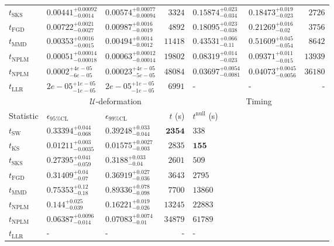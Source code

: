 \begin{tabular}{l|llr|llr}
	$t_{\mathrm{SKS}}$ & $0.00441_{-0.0014}^{+0.00092}$ & $0.00574_{-0.00094}^{+0.00077}$ & $3324$ & $0.15874_{-0.034}^{+0.023}$ & $0.18473_{-0.023}^{+0.019}$ & $2726$ \\
	$t_{\mathrm{FGD}}$ & $0.00722_{-0.0027}^{+0.0021}$ & $0.00987_{-0.0019}^{+0.0016}$ & $4892$ & $0.18095_{-0.038}^{+0.023}$ & $0.21269_{-0.02}^{+0.016}$ & $3756$ \\
	$t_{\mathrm{MMD}}$ & $0.00353_{-0.0015}^{+0.0016}$ & $0.00494_{-0.0012}^{+0.0014}$ & $11418$ & $0.43531_{-0.11}^{+0.066}$ & $0.51609_{-0.054}^{+0.045}$ & $8642$ \\
\rowcolor{red!35}	$t_{\mathrm{NPLM}}$ & $0.00051_{-0.00018}^{+0.00014}$ & $0.00063_{-0.00014}^{+0.00012}$ & $19802$ & $0.08319_{-0.023}^{+0.014}$ & $0.09371_{-0.015}^{+0.011}$ & $13939$ \\
\rowcolor{blue!35}	$t_{\mathrm{NPLM}}$ & $0.0002_{-6e-05}^{+4e-05}$ & $0.00023_{-5e-05}^{+4e-05}$ & $48084$ & $0.03697_{-0.0081}^{+0.0054}$ & $0.04073_{-0.0056}^{+0.0045}$ & $36180$ \\
	$t_{\mathrm{LLR}}$ & $2e-05_{-1e-05}^{+1e-05}$ & $2e-05_{-1e-05}^{+1e-05}$ & $6991$ & - & - & - \\
	\toprule
	\multicolumn{1}{c}{} & \multicolumn{3}{c}{$\mathcal{U}$-deformation} & \multicolumn{3}{c}{Timing} \\
	Statistic & $\epsilon_{95\%\mathrm{CL}}$ & $\epsilon_{99\%\mathrm{CL}}$ & $t$ (s) & $t^{\mathrm{null}}$ (s) \\
	\midrule
	$t_{\mathrm{SW}}$ & $0.33394_{-0.068}^{+0.044}$ & $0.39248_{-0.044}^{+0.033}$ & ${\mathbf{2354}}$ & $338$ \\
	$t_{\overline{\mathrm{KS}}}$ & ${\mathbf{0.01211_{-0.0035}^{+0.003}}}$ & ${\mathbf{0.01575_{-0.003}^{+0.0027}}}$ & $2835$ & ${\mathbf{155}}$ \\
	$t_{\mathrm{SKS}}$ & $0.27395_{-0.059}^{+0.041}$ & $0.3188_{-0.04}^{+0.033}$ & $2601$ & $509$ \\
	$t_{\mathrm{FGD}}$ & $0.31409_{-0.07}^{+0.04}$ & $0.36919_{-0.036}^{+0.027}$ & $3643$ & $2795$ \\
	$t_{\mathrm{MMD}}$ & $0.75353_{-0.18}^{+0.12}$ & $0.89336_{-0.098}^{+0.078}$ & $7700$ & $13860$ \\
\rowcolor{red!35}	$t_{\mathrm{NPLM}}$ & $0.144_{-0.039}^{+0.025}$ & $0.16221_{-0.026}^{+0.019}$ & $13245$ & $22883$ \\
\rowcolor{blue!35}	$t_{\mathrm{NPLM}}$ & $0.06387_{-0.014}^{+0.0096}$ & $0.07083_{-0.01}^{+0.0074}$ & $34879$ & $61789$ \\
	$t_{\mathrm{LLR}}$ & - & - & - & - \\
	\bottomrule
\end{tabular}